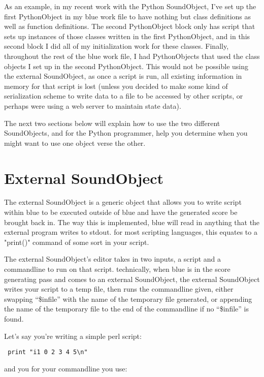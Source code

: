 As an example, in my recent work with the Python SoundObject, I've set
up the first PythonObject in my blue work file to have nothing but class
definitions as well as function definitions. The second PythonObject
block only has script that sets up instances of those classes written in
the first PythonObject, and in this second block I did all of my
initialization work for these classes. Finally, throughout the rest of
the blue work file, I had PythonObjects that used the class objects I
set up in the second PythonObject. This would not be possible using the
external SoundObject, as once a script is run, all existing information
in memory for that script is lost (unless you decided to make some kind
of serialization scheme to write data to a file to be accessed by other
scripts, or perhaps were using a web server to maintain state data).

The next two sections below will explain how to use the two different
SoundObjects, and for the Python programmer, help you determine when you
might want to use one object verse the other.

\section{External SoundObject}

The external SoundObject is a generic object that allows you to write
script within blue to be executed outside of blue and have the generated
score be brought back in. The way this is implemented, blue will read in
anything that the external program writes to stdout. for most scripting
languages, this equates to a "print()" command of some sort in your
script.

The external SoundObject's editor takes in two inputs, a script and a
commandline to run on that script. technically, when blue is in the
score generating pass and comes to an external SoundObject, the external
SoundObject writes your script to a temp file, then runs the commandline
given, either swapping ``\$infile'' with the name of the temporary file
generated, or appending the name of the temporary file to the end of the
commandline if no ``\$infile'' is found.

Let's say you're writing a simple perl script:

\begin{verbatim}
 print "i1 0 2 3 4 5\n"
\end{verbatim}

and you for your commandline you use:

